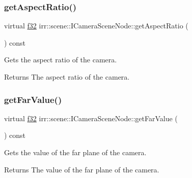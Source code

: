 \subsubsection{\texorpdfstring{get\+Aspect\+Ratio()}{getAspectRatio()}}
{\footnotesize\ttfamily virtual \hyperlink{namespaceirr_a0277be98d67dc26ff93b1a6a1d086b07}{f32} irr\+::scene\+::\+I\+Camera\+Scene\+Node\+::get\+Aspect\+Ratio (\begin{DoxyParamCaption}{ }\end{DoxyParamCaption}) const\hspace{0.3cm}{\ttfamily [pure virtual]}}



Gets the aspect ratio of the camera. 

\begin{DoxyReturn}{Returns}
The aspect ratio of the camera. 
\end{DoxyReturn}
\mbox{\label{classirr_1_1scene_1_1ICameraSceneNode_a7a6603b808522605276359b834d48245}} 
\subsubsection{\texorpdfstring{get\+Far\+Value()}{getFarValue()}}
{\footnotesize\ttfamily virtual \hyperlink{namespaceirr_a0277be98d67dc26ff93b1a6a1d086b07}{f32} irr\+::scene\+::\+I\+Camera\+Scene\+Node\+::get\+Far\+Value (\begin{DoxyParamCaption}{ }\end{DoxyParamCaption}) const\hspace{0.3cm}{\ttfamily [pure virtual]}}



Gets the value of the far plane of the camera. 

\begin{DoxyReturn}{Returns}
The value of the far plane of the camera. 
\end{DoxyReturn}
\mbox{\label{classirr_1_1scene_1_1ICameraSceneNode_a8396148b1c3e27e79a615a859ae7d75d}} 
